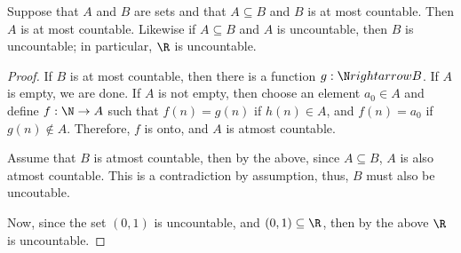 \begin{theorem}
    Suppose that $A$ and $B$ are sets and that $A \subseteq B$ and $B$ is at most countable. Then $A$ is at most countable.
    Likewise if $ A \subseteq B$ and $A$ is uncountable, then  $B$ is uncountable; in particular, $\R$ is uncountable.
\end{theorem}
\begin{proof}
    If $B$ is at most countable, then there is a function $g:\N rightarrow B$. If $A$ is empty, we are done. If  $A$ is not 
    empty, then choose an element $a_0 \in A$ and define $f:\N \rightarrow A$ such that  $f(n)=g(n)$ if  $h(n) \in A$, and 
    $f(n)=a_0$ if $g(n) \notin A$. Therefore,  $f$ is onto, and  $A$ is atmost countable.

    Assume that $B$ is atmost countable, then by the above, since  $A \subseteq B$, $A$ is also atmost countable. This is a 
    contradiction by assumption, thus,  $B$ must also be uncoutable.

    Now, since the set  $(0,1)$ is uncountable, and  $(0,1) \subseteq \R$, then by the above  $\R$ is uncountable.
\end{proof}

